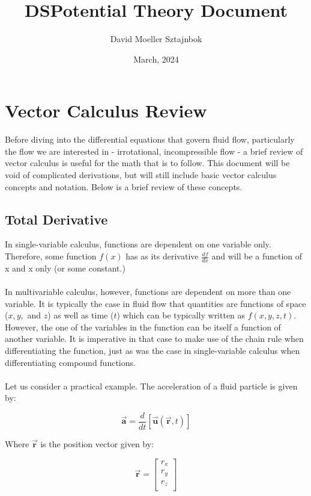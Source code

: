 \documentclass[11pt]{article}
\title{DSPotential Theory Document}
\author{ David Moeller Sztajnbok }
\date{March, 2024}
\begin{document}
\maketitle


\section{Vector Calculus Review}
Before diving into the differential equations that govern fluid flow, particularly the flow we are interested in - irrotational, incompressible flow - a brief review of vector calculus is useful for the math that is to follow. This document will be void of complicated derivations, but will still include basic vector calculus concepts and notation. Below is a brief review of these concepts. \\
\subsection{Total Derivative}
\noindent
In single-variable calculus, functions are dependent on one variable only. Therefore, some function $f(x)$ has as its derivative $\frac{df}{dx}$ and will be a function of x and x only (or some constant.)\\ \\
\noindent
In multivariable calculus, however, functions are dependent on more than one variable. It is typically the case in fluid flow that quantities are functions of space ($x, y,$ and $z$) as well as time ($t$) which can be typically written as $f(x, y, z, t)$. However, the one of the variables in the function can be itself a function of another variable. It is imperative in that case to make use of the chain rule when differentiating the function, just as was the case in single-variable calculus when differentiating compound functions. \\ \\
\noindent
Let us consider a practical example. The acceleration of a fluid particle is given by:

\begin{equation*}
    \vec{\bm{a}} = \frac{d}{dt}[\vec{\bm{u}}(\vec{\bm{r}}, t)]
\end{equation*}

\noindent
Where $\vec{\bm{r}}$ is the position vector given by:

\begin{equation*}
    \vec{\bm{r}} = \begin{bmatrix}
                    r_x \\
                    r_y \\
                    r_z \\     
                    \end{bmatrix}
\end{equation*}
\end{document}
